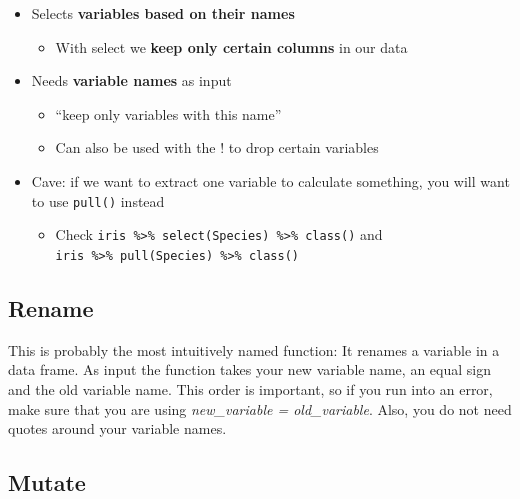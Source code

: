 \documentclass[
]{book}
\providecommand{\tightlist}{%
  \setlength{\itemsep}{0pt}\setlength{\parskip}{0pt}}
\begin{document}
\begin{itemize}
\tightlist
\item
  Selects \textbf{variables based on their names}

  \begin{itemize}
  \tightlist
  \item
    With select we \textbf{keep only certain columns} in our data
  \end{itemize}
\item
  Needs \textbf{variable names} as input

  \begin{itemize}
  \tightlist
  \item
    ``keep only variables with this name''
  \item
    Can also be used with the ! to drop certain variables
  \end{itemize}
\item
  Cave: if we want to extract one variable to calculate something, you will want to use \texttt{pull()} instead

  \begin{itemize}
  \tightlist
  \item
    Check \texttt{iris\ \%\textgreater{}\%\ select(Species)\ \%\textgreater{}\%\ class()} and \texttt{iris\ \%\textgreater{}\%\ pull(Species)\ \%\textgreater{}\%\ class()}
  \end{itemize}
\end{itemize}

\subsection{Rename}\label{rename}

This is probably the most intuitively named function: It renames a variable in a data frame.
As input the function takes your new variable name, an equal sign and the old variable name.
This order is important, so if you run into an error, make sure that you are using \emph{new\_variable = old\_variable}.
Also, you do not need quotes around your variable names.

\subsection{Mutate}\label{mutate}
\end{document}
